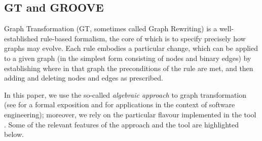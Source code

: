 
\subsection{GT and GROOVE}\label{sec:GTS}

Graph Transformation (GT, sometimes called Graph Rewriting) is a well-established rule-based formalism, the core of which is to specify precisely how graphs may evolve. Each rule embodies a particular change, which can be applied to a given graph (in the simplest form consisting of nodes and binary edges) by establishing where in that graph the preconditions of the rule are met, and then adding and deleting nodes and edges as prescribed.

In this paper, we use the so-called \emph{algebraic approach} to graph transformation (see \cite{DBLP:series/eatcs/EhrigEPT06} for a formal exposition and \cite{DBLP:books/sp/HeckelT20} for applications in the context of software engineering); moreover, we rely on the particular flavour implemented in the tool \GROOVE \cite{DBLP:journals/sttt/GhamarianMRZZ12,GROOVE}. Some of the relevant features of the approach and the tool are highlighted below.
%
%
%
%
